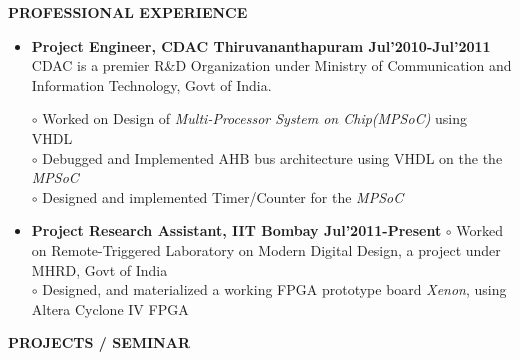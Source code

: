 \documentclass[a4paper,10pt]{article}
\begin{document}
 
  \colorbox{titleColor}{\parbox{6.5in}{\textbf{PROFESSIONAL EXPERIENCE}}}
   \begin{itemize}
    \item \textbf{Project Engineer, CDAC Thiruvananthapuram \qquad\qquad\qquad\quad\qquad\qquad Jul'2010-Jul'2011\\}
    CDAC is a premier R\&D Organization under Ministry of Communication and Information Technology, Govt of India.

    $\circ$  Worked on  Design of \textit{Multi-Processor System on Chip(MPSoC)} using VHDL \\
    $\circ$  Debugged and Implemented AHB bus architecture using VHDL on the the \textit{MPSoC}\\
    $\circ$  Designed and implemented Timer/Counter for the \textit{MPSoC}
    \item \textbf{Project Research Assistant, IIT Bombay 	\qquad\qquad\qquad\qquad\quad\qquad\qquad\qquad Jul'2011-Present}
     $\circ$ Worked on Remote-Triggered Laboratory on Modern Digital Design, a project under MHRD, Govt of India\\
    $\circ$ Designed, and materialized a working FPGA prototype board \textit{Xenon}, using Altera Cyclone IV FPGA  
    
 \end{itemize}
 


 \colorbox{titleColor}{\parbox{6.5in}{\textbf{PROJECTS / SEMINAR}}}
\end{document}
